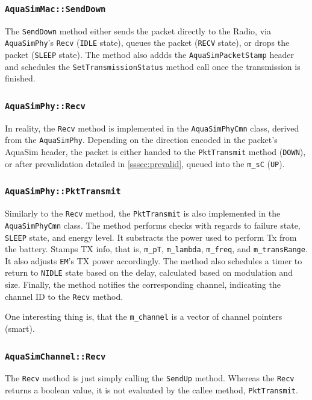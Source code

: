 \documentclass[a4paper]{article}
\begin{document}
\subsubsection{\texttt{AquaSimMac::SendDown}}
The \texttt{SendDown} method either sends the packet directly to the Radio, via \texttt{AquaSimPhy}'s \texttt{Recv} (\texttt{IDLE} state), queues the packet (\texttt{RECV} state), or drops the packet (\texttt{SLEEP} state). The method also addds the \texttt{AquaSimPacketStamp} header and schedules the \texttt{SetTransmissionStatus} method call once the transmission is finished.

\subsubsection{\texttt{AquaSimPhy::Recv}}\label{sssec:radio_recv}
In reality, the \texttt{Recv} method is implemented in the \texttt{AquaSimPhyCmn} class, derived from the \texttt{AquaSimPhy}. Depending on the direction encoded in the packet's AquaSim header, the packet is either handed to the \texttt{PktTransmit} method (\texttt{DOWN}), or after prevalidation detailed in \cref{sssec:prevalid}, queued into the \texttt{m\_sC} (\texttt{UP}).

\subsubsection{\texttt{AquaSimPhy::PktTransmit}}
Similarly to the \texttt{Recv} method, the \texttt{PktTransmit} is also implemented in the \texttt{AquaSimPhyCmn} class. The method performs checks with regards to failure state, \texttt{SLEEP} state, and energy level. It substracts the power used to perform Tx from the battery. Stamps TX info, that is, \texttt{m\_pT}, \texttt{m\_lambda}, \texttt{m\_freq}, and \texttt{m\_transRange}. It also adjusts \texttt{EM}'s TX power accordingly. The method also schedules a timer to return to \texttt{NIDLE} state based on the delay, calculated based on modulation and size. Finally, the method notifies the corresponding channel, indicating the channel ID to the \texttt{Recv} method.

One interesting thing is, that the \texttt{m\_channel} is a vector of channel pointers (smart).

\subsubsection{\texttt{AquaSimChannel::Recv}}
The \texttt{Recv} method is just simply calling the \texttt{SendUp} method. Whereas the \texttt{Recv} returns a boolean value, it is not evaluated by the callee method, \texttt{PktTransmit}.
\end{document}
